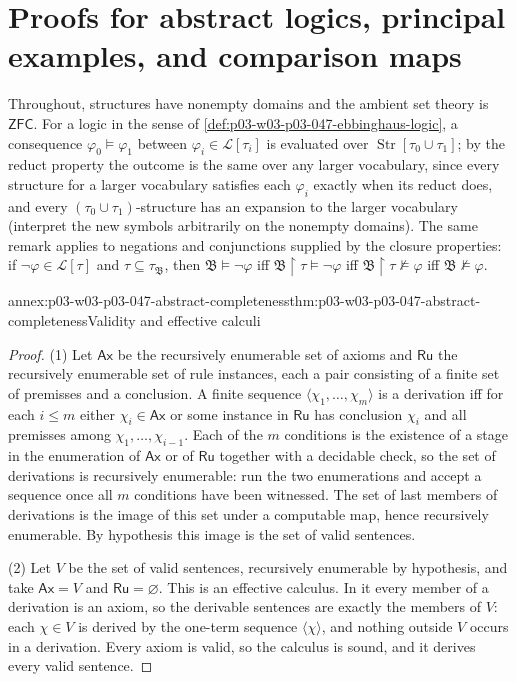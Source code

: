 \section{Proofs for abstract logics, principal examples, and comparison maps}
\label{sec:annex-p03-w03-p03-047-abstract-logics}

Throughout, structures have nonempty domains and the ambient set theory is
\(\mathsf{ZFC}\).  For a logic in the sense of
\cref{def:p03-w03-p03-047-ebbinghaus-logic}, a consequence
\(\varphi_0\models\varphi_1\) between \(\varphi_i\in\mathscr L[\tau_i]\) is
evaluated over \(\operatorname{Str}[\tau_0\cup\tau_1]\); by the reduct
property the outcome is the same over any larger vocabulary, since every
structure for a larger vocabulary satisfies each \(\varphi_i\) exactly when
its reduct does, and every \((\tau_0\cup\tau_1)\)-structure has an expansion
to the larger vocabulary (interpret the new symbols arbitrarily on the
nonempty domains).  The same remark applies to negations and conjunctions
supplied by the closure properties: if \(\neg\varphi\in\mathscr L[\tau]\) and
\(\tau\subseteq\tau_{\mathfrak B}\), then \(\mathfrak B\models\neg\varphi\)
iff \(\mathfrak B\restriction\tau\models\neg\varphi\) iff
\(\mathfrak B\restriction\tau\not\models\varphi\) iff
\(\mathfrak B\not\models\varphi\).

\begin{annexitem}{annex:p03-w03-p03-047-abstract-completeness}{thm:p03-w03-p03-047-abstract-completeness}{Validity and effective calculi}
\begin{proof}
(1) Let \(\mathsf{Ax}\) be the recursively enumerable set of axioms and
\(\mathsf{Ru}\) the recursively enumerable set of rule instances, each a pair
consisting of a finite set of premisses and a conclusion.  A finite sequence
\(\langle\chi_1,\ldots,\chi_m\rangle\) is a derivation iff for each
\(i\le m\) either \(\chi_i\in\mathsf{Ax}\) or some instance in \(\mathsf{Ru}\)
has conclusion \(\chi_i\) and all premisses among
\(\chi_1,\ldots,\chi_{i-1}\).  Each of the \(m\) conditions is the
existence of a stage in the enumeration of \(\mathsf{Ax}\) or of
\(\mathsf{Ru}\) together with a decidable check, so the set of derivations is
recursively enumerable: run the two enumerations and accept a sequence once
all \(m\) conditions have been witnessed.  The set of last members of
derivations is the image of this set under a computable map, hence
recursively enumerable.  By hypothesis this image is the set of valid
sentences.

(2) Let \(V\) be the set of valid sentences, recursively enumerable by
hypothesis, and take \(\mathsf{Ax}=V\) and \(\mathsf{Ru}=\varnothing\).  This
is an effective calculus.  In it every member of a derivation is an axiom,
so the derivable sentences are exactly the members of \(V\): each
\(\chi\in V\) is derived by the one-term sequence \(\langle\chi\rangle\), and
nothing outside \(V\) occurs in a derivation.  Every axiom is valid, so the
calculus is sound, and it derives every valid sentence.
\end{proof}
\end{annexitem}

